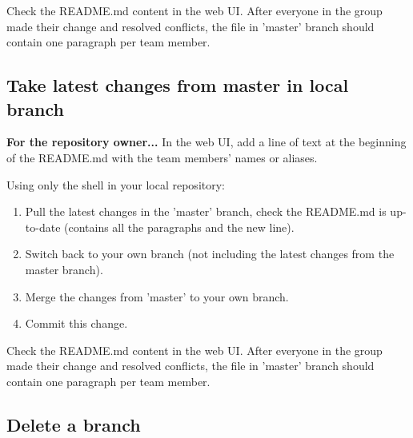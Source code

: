 Check the README.md content in the web UI.
After everyone in the group made their change and resolved conflicts, the file in 'master' branch should contain one paragraph per team member.


\subsection{Take latest changes from master in local branch}  %

\textbf{For the repository owner...} In the web UI, add a line of text at the beginning of the README.md with the team members' names or aliases.

Using only the shell in your local repository:
\begin{enumerate}
    \item Pull the latest changes in the 'master' branch, check the README.md is up-to-date (contains all the paragraphs and the new line).
    \item Switch back to your own branch (not including the latest changes from the master branch).
    \item Merge the changes from 'master' to your own branch.
    \item Commit this change.
\end{enumerate}

Check the README.md content in the web UI.
After everyone in the group made their change and resolved conflicts, the file in 'master' branch should contain one paragraph per team member.


\subsection{Delete a branch}  %

